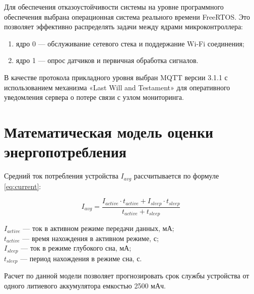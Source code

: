 Для обеспечения отказоустойчивости системы на уровне программного обеспечения выбрана операционная система реального времени FreeRTOS. Это позволяет эффективно распределять задачи между ядрами микроконтроллера:
\begin{enumerate}
    \item ядро 0 --- обслуживание сетевого стека и поддержание Wi-Fi соединения;
    \item ядро 1 --- опрос датчиков и первичная обработка сигналов.
\end{enumerate}

В качестве протокола прикладного уровня выбран MQTT версии 3.1.1 с использованием механизма «Last Will and Testament» для оперативного уведомления сервера о потере связи с узлом мониторинга.

\section{Математическая модель оценки энергопотребления}

Средний ток потребления устройства $I_{avg}$ рассчитывается по формуле \eqref{eq:current}:

\begin{equation}
    I_{avg} = \frac{I_{active} \cdot t_{active} + I_{sleep} \cdot t_{sleep}}{t_{active} + t_{sleep}}
    \label{eq:current}
\end{equation}

\begin{formula_where}
    $I_{active}$ --- ток в активном режиме передачи данных, мА; \\
    $t_{active}$ --- время нахождения в активном режиме, с; \\
    $I_{sleep}$ --- ток в режиме глубокого сна, мА; \\
    $t_{sleep}$ --- период нахождения в режиме сна, с.
\end{formula_where}

Расчет по данной модели позволяет прогнозировать срок службы устройства от одного литиевого аккумулятора емкостью 2500 мАч.

\newpage